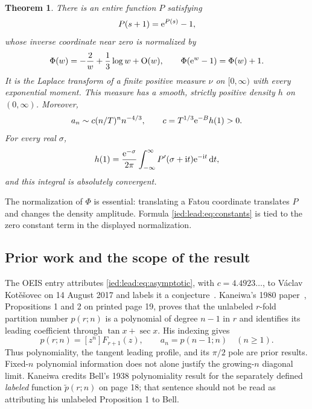 \documentclass[11pt,letterpaper]{article}
\newtheorem{theorem}{Theorem}[section]
\theoremstyle{remark}\newtheorem{remark}[theorem]{Remark}
\newcommand{\ii}{\mathrm i}\newcommand{\dd}{\,\mathrm d}
\newcommand{\Oh}{\mathrm O}\newcommand{\supp}{\operatorname{supp}}
\begin{document}
\begin{theorem}\label{ied:lead:thm:main}
There is an entire function $P$ satisfying
\begin{equation}\label{ied:lead:eq:P}
 P(s+1)=\mathrm e^{P(s)}-1,
\end{equation}
whose inverse coordinate near zero is normalized by
\[
 \Phi(w)=-\frac2w+\frac13\log w+\Oh(w),\qquad
 \Phi(\e^w-1)=\Phi(w)+1.
\]
It is the Laplace transform of a finite positive measure $\nu$ on $[0,\infty)$ with every exponential moment. This measure has a smooth, strictly positive density $h$ on $(0,\infty)$. Moreover,
\begin{equation}\label{ied:lead:eq:asymptotic}
 a_n\sim c(n/T)^n n^{-4/3},\qquad
 c=T^{1/3}\mathrm e^{-B}h(1)>0.
\end{equation}
For every real $\sigma$,
\begin{equation}\label{ied:lead:eq:constantintegral}
 h(1)=\frac{\e^{-\sigma}}{2\pi}
 \int_{-\infty}^{\infty}P'(\sigma+\ii t)\e^{-\ii t}\dd t,
\end{equation}
and this integral is absolutely convergent.
\end{theorem}

The normalization of $\Phi$ is essential: translating a Fatou coordinate translates $P$ and changes the density amplitude. Formula \eqref{ied:lead:eq:constants} is tied to the zero constant term in the displayed normalization.

\subsection{Prior work and the scope of the result}\label{ied:lead:sub:prior}
The OEIS entry attributes \eqref{ied:lead:eq:asymptotic}, with $c=4.4923\ldots$, to V\'aclav Kot\v{e}\v{s}ovec on 14 August 2017 and labels it a conjecture~\cite{A290354}. Kaneiwa's 1980 paper~\cite{Kaneiwa}, Propositions 1 and 2 on printed page 19, proves that the unlabeled $r$-fold partition number $p(r;n)$ is a polynomial of degree $n-1$ in $r$ and identifies its leading coefficient through $\tan x+\sec x$. His indexing gives
\[
 p(r;n)=[z^n]F_{r+1}(z),\qquad a_n=p(n-1;n)\quad(n\ge1).
\]
Thus polynomiality, the tangent leading profile, and its $\pi/2$ pole are prior results. Fixed-$n$ polynomial information does not alone justify the growing-$n$ diagonal limit. Kaneiwa credits Bell's 1938 polynomiality result for the separately defined \emph{labeled} function $\widetilde p(r;n)$ on page 18; that sentence should not be read as attributing his unlabeled Proposition 1 to Bell.
\end{document}
